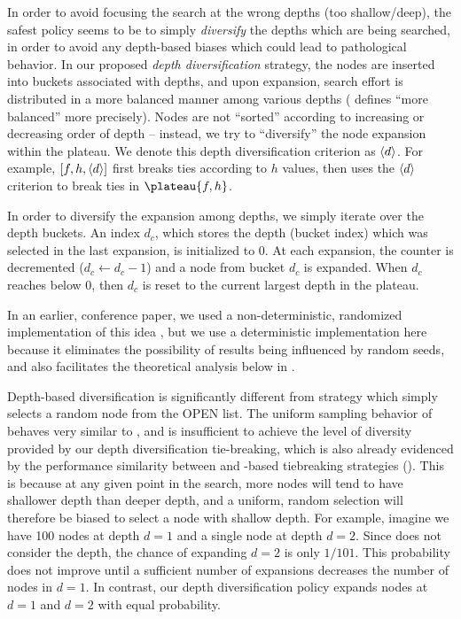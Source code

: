In order to avoid focusing the search at the wrong depths (too shallow/deep), 
the safest policy seems to be to simply \emph{diversify} the depths which are being searched,
in order to avoid any depth-based biases which could lead to pathological behavior.
In our proposed \emph{depth diversification} strategy, the nodes are inserted into buckets
associated with depths, and upon expansion, search effort is distributed in a more balanced manner
among various depths ( defines ``more balanced''  more precisely).
Nodes are not  ``sorted''
according to increasing or decreasing order of depth -- instead, we try to 
``diversify'' the node expansion within the plateau.
We denote this depth diversification criterion as ${\left<d\right>}$. 
For example, $[f,h,{\left<d\right>}]$ first breaks ties according to $h$ values,
then uses the ${\left<d\right>}$ criterion to break ties in $\plateau{f,h}$.

In order to diversify the expansion among depths, we simply
iterate over the depth buckets. An index $d_c$,
 which stores the depth (bucket index)  which was selected in the last expansion,
is initialized to 0.
At each expansion, the counter is decremented ($d_c\leftarrow d_c-1$) and
a node from  bucket $d_c$ is expanded. When $d_c$ reaches below 0, then $d_c$
is reset to the current largest depth in the plateau.

In an earlier, conference paper, we used a non-deterministic,
randomized implementation of this idea \cite{Asai2016}, but we use a deterministic
implementation here because it eliminates the possibility of results being influenced by random seeds,
and also facilitates the  theoretical analysis below in .

Depth-based diversification is significantly different from \ro strategy which simply selects a random node from the OPEN list.
The uniform sampling behavior of  \ro behaves very similar to \fifo, and is insufficient to achieve the level of diversity provided by our depth diversification tie-breaking,
which is also already evidenced by the performance similarity between \fifo and \ro-based tiebreaking strategies ().
This is because at any given point in the search, more nodes will tend to have shallower depth than deeper depth, and a uniform, random selection will therefore be biased to select a node with shallow depth.
For example, imagine we have 100 nodes at depth $d=1$ and a single node at depth $d=2$.
Since \ro does not consider the depth, the chance of expanding $d=2$ is only $1/101$.
This probability does not improve until a sufficient number of expansions decreases the number of nodes in $d=1$.
In contrast, our depth diversification policy expands nodes at $d=1$ and $d=2$ with equal probability.


